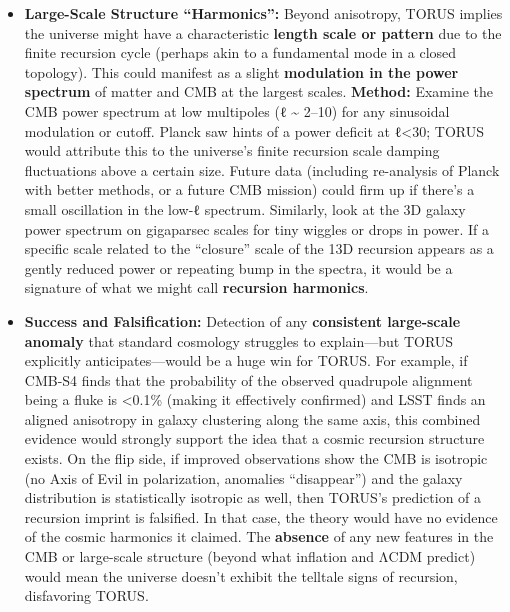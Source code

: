 \documentclass[]{article}
\begin{document}
\begin{itemize}
\begin{itemize}
{    ``hot/cold'' spots and the pattern of matter distribution} if both
    are influenced by the same recursion geometry​. For instance, the
    plane along which the CMB quadrupole is weakest might be the plane
    dividing a slightly higher-density half of the local universe from a
    lower-density half​. If analyses find that the CMB's weird features
    have a counterpart in galaxy data (a very specific, unlikely
    coincidence under random isotropy), that would strongly point to a
    common cause like TORUS's toroidal universe model​.
  \item
    \textbf{Large-Scale Structure ``Harmonics'':} Beyond anisotropy,
    TORUS implies the universe might have a characteristic
    \textbf{length scale or pattern} due to the finite recursion cycle
    (perhaps akin to a fundamental mode in a closed topology). This
    could manifest as a slight \textbf{modulation in the power spectrum}
    of matter and CMB at the largest scales. \textbf{Method:} Examine
    the CMB power spectrum at low multipoles (ℓ \textasciitilde{} 2--10)
    for any sinusoidal modulation or cutoff. Planck saw hints of a power
    deficit at ℓ\textless{}30; TORUS would attribute this to the
    universe's finite recursion scale damping fluctuations above a
    certain size​. Future data (including re-analysis of Planck with
    better methods, or a future CMB mission) could firm up if there's a
    small oscillation in the low-ℓ spectrum. Similarly, look at the 3D
    galaxy power spectrum on gigaparsec scales for tiny wiggles or drops
    in power. If a specific scale related to the ``closure'' scale of
    the 13D recursion appears as a gently reduced power or repeating
    bump in the spectra, it would be a signature of what we might call
    \textbf{recursion harmonics}​.
  \item
    \textbf{Success and Falsification:} Detection of any
    \textbf{consistent large-scale anomaly} that standard cosmology
    struggles to explain---but TORUS explicitly anticipates---would be a
    huge win for TORUS. For example, if CMB-S4 finds that the
    probability of the observed quadrupole alignment being a fluke is
    \textless{}0.1\% (making it effectively confirmed) and LSST finds an
    aligned anisotropy in galaxy clustering along the same axis, this
    combined evidence would strongly support the idea that a cosmic
    recursion structure exists​. On the flip side, if improved
    observations show the CMB is isotropic (no Axis of Evil in
    polarization, anomalies ``disappear'') and the galaxy distribution
    is statistically isotropic as well, then TORUS's prediction of a
    recursion imprint is falsified​. In that case, the theory would have
    no evidence of the cosmic harmonics it claimed. The \textbf{absence}
    of any new features in the CMB or large-scale structure (beyond what
    inflation and ΛCDM predict) would mean the universe doesn't exhibit
    the telltale signs of recursion, disfavoring TORUS.
  \end{itemize}
\end{itemize}
\end{document}
